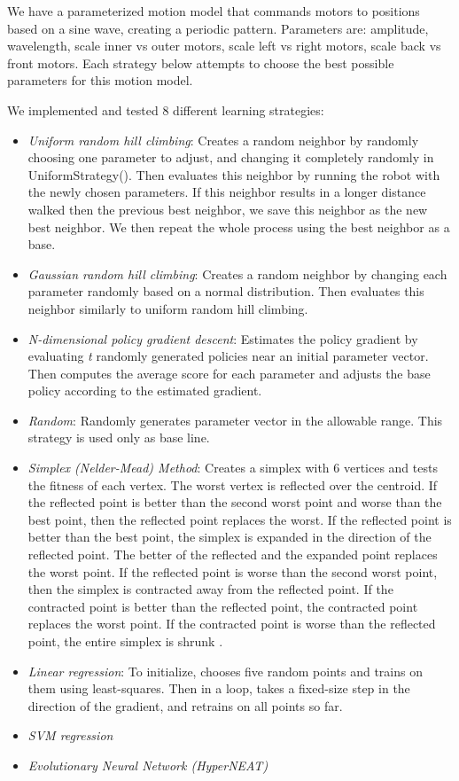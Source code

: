 We have a parameterized motion model that commands motors to positions
based on a sine wave, creating a periodic pattern. Parameters are: 
amplitude, wavelength, scale inner vs outer motors, scale left vs right 
motors, scale back vs front motors. Each strategy below attempts to choose
the best possible parameters for this motion model. 

We implemented and tested 8 different learning strategies:
\begin{itemize}
\item \emph{Uniform random hill climbing}: Creates a random neighbor by
  randomly choosing one parameter to adjust, and changing it completely 
  randomly in UniformStrategy(). Then evaluates this neighbor by running 
  the robot with the newly chosen parameters. If this neighbor results in a
  longer distance walked then the previous best neighbor, we save this
  neighbor as the new best neighbor. We then repeat the whole process
  using the best neighbor as a base.
\item \emph{Gaussian random hill climbing}: Creates a random neighbor by
  changing each parameter randomly based on a normal distribution. Then
  evaluates this neighbor similarly to uniform random hill climbing.
\item \emph{N-dimensional policy gradient descent}: Estimates the policy
  gradient by evaluating \emph{t} randomly generated policies
  near an initial parameter vector. Then computes the average score for
  each parameter and adjusts the base policy according to the estimated
  gradient.
\item \emph{Random}: Randomly generates parameter vector in the allowable
  range. This strategy is used only as base line.
\item \emph{Simplex (Nelder-Mead) Method}: Creates a simplex with 6 vertices and tests the fitness of each vertex. The worst vertex is reflected over the centroid. If the reflected point is better than the second worst point and worse than the best point, then the reflected point replaces the worst. If the reflected point is better than the best point, the simplex is expanded in the direction of the reflected point. The better of the reflected and the expanded point replaces the worst point. If the reflected point is worse than the second worst point, then the simplex is contracted away from the reflected point. If the contracted point is better than the reflected point, the contracted point replaces the worst point. If the contracted point is worse than the reflected point, the entire simplex is shrunk \cite{NMWebsite}.
\item \emph{Linear regression}: To initialize, chooses five random points
and trains on them using least-squares. Then in a loop, takes a fixed-size
step in the direction of the gradient, and retrains on all points so far.
\item \emph{SVM regression}
\item \emph{Evolutionary Neural Network (HyperNEAT)\cite{2}}
\end{itemize}



